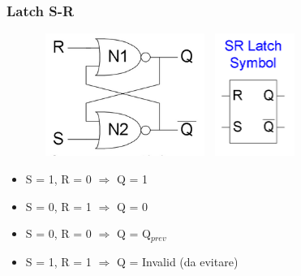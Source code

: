 \documentclass{report}
\begin{document}
        \subsubsection{Latch S-R}
            \begin{center}
                \begin{figure}[h]
                    \includegraphics[width=0.5\textwidth, height=4cm]{latchsr.png}
                    \includegraphics[width=.5\textwidth, height=4cm]{latchsr2.png}
                \end{figure}
            \end{center}
            \begin{itemize}
                \item S = 1, R = 0 $\Longrightarrow$ Q = 1
                \item S = 0, R = 1 $\Longrightarrow$ Q = 0
                \item S = 0, R = 0 $\Longrightarrow$ Q = Q$_{prev}$
                \item S = 1, R = 1 $\Longrightarrow$ Q = Invalid (da evitare)
            \end{itemize}
\end{document}
